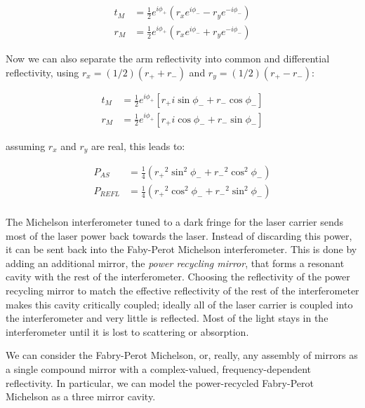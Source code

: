 \begin{align}
t_M  &= \frac{1}{2} e^{i\phi_+} \left(r_x e^{i \phi_- } - r_y e^{-i \phi_-} \right) \\
r_M  &= \frac{1}{2} e^{i\phi_+} \left(r_x e^{i \phi_- } + r_y e^{-i \phi_-} \right) 
\end{align}

Now we can also separate the arm reflectivity into common and differential reflectivity, using $r_x = (1/2)(r_+ + r_-)$ and $r_y = (1/2)(r_+ - r_-)$:

\begin{align}
t_M  &= \frac{1}{2} e^{i\phi_+} \left[ r_+ i \sin \phi_- + r_- \cos \phi_- \right]\\
r_M  &= \frac{1}{2} e^{i\phi_+} \left[ r_+ i \cos \phi_- + r_- \sin \phi_- \right] 
\end{align}

assuming $r_x$ and $r_y$ are real, this leads to:

\begin{align}
P_{AS}   &= \frac{1}{4}\left( {r_+}^2 \sin^2 \phi_- + {r_-}^2 \cos^2 \phi_-\right) \\
P_{REFL} &= \frac{1}{4}\left( {r_+}^2 \cos^2 \phi_- + {r_-}^2 \sin^2 \phi_-\right) \\
\end{align}

\cite{Fritschel2001Readout}

The Michelson interferometer tuned to a dark fringe for the laser
carrier sends most of the laser power back towards the laser.  Instead
of discarding this power, it can be sent back into the Faby-Perot
Michelson interferometer.  This is done by adding an additional
mirror, the \emph{power recycling mirror}, that forms a resonant
cavity with the rest of the interferometer.  Choosing the reflectivity
of the power recycling mirror to match the effective reflectivity of
the rest of the interferometer makes this cavity critically coupled;
ideally all of the laser carrier is coupled into the interferometer
and very little is reflected.  Most of the light stays in the
interferometer until it is lost to scattering or absorption.


We can consider the Fabry-Perot Michelson, or, really, any assembly of
mirrors as a single compound mirror with a complex-valued,
frequency-dependent reflectivity.  In particular, we can model the
power-recycled Fabry-Perot Michelson as a three mirror cavity.

